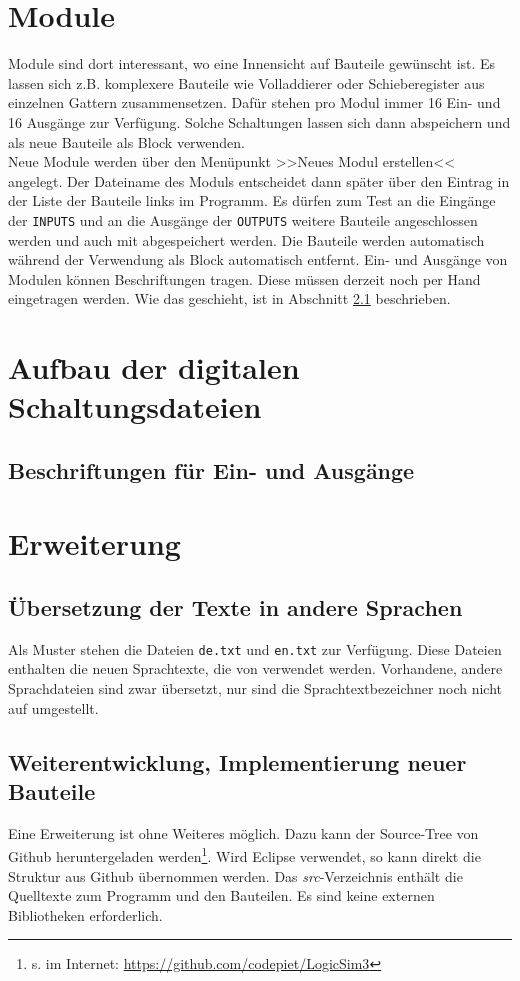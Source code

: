 \documentclass[12pt]{scrartcl}
\begin{document}
\section{Module}
Module sind dort interessant, wo eine Innensicht auf Bauteile gewünscht ist. Es lassen sich z.B. komplexere Bauteile wie Volladdierer oder Schieberegister aus einzelnen Gattern zusammensetzen. Dafür stehen pro Modul immer 16 Ein- und 16 Ausgänge zur Verfügung. Solche Schaltungen lassen sich dann abspeichern und als neue Bauteile als Block verwenden.\\

Neue Module werden über den Menüpunkt >>Neues Modul erstellen<< angelegt. Der Dateiname des Moduls entscheidet dann später über den Eintrag in der Liste der Bauteile links im Programm. Es dürfen zum Test an die Eingänge der \texttt{INPUTS} und an die Ausgänge der \texttt{OUTPUTS} weitere Bauteile angeschlossen werden und auch mit abgespeichert werden. Die Bauteile werden automatisch während der Verwendung als Block automatisch entfernt.
Ein- und Ausgänge von Modulen können Beschriftungen tragen. Diese müssen derzeit noch per Hand eingetragen werden. Wie das geschieht, ist in Abschnitt \ref{labels} beschrieben.

\section{Aufbau der digitalen Schaltungsdateien}
\subsection{Beschriftungen für Ein- und Ausgänge}
\label{labels}

\section{Erweiterung}
\subsection{Übersetzung der Texte in andere Sprachen}
Als Muster stehen die Dateien \texttt{de.txt} und \texttt{en.txt} zur Verfügung. Diese Dateien enthalten die neuen Sprachtexte, die von \lsN{} verwendet werden. Vorhandene, andere Sprachdateien sind zwar übersetzt, nur sind die Sprachtextbezeichner noch nicht auf \lsN{} umgestellt.

\subsection{Weiterentwicklung, Implementierung neuer Bauteile}
Eine Erweiterung ist ohne Weiteres möglich. Dazu kann der Source-Tree von Github heruntergeladen werden\footnote{s. im Internet: \url{https://github.com/codepiet/LogicSim3}}. Wird Eclipse verwendet, so kann direkt die Struktur aus Github übernommen werden. Das \textit{src}-Verzeichnis enthält die Quelltexte zum Programm und den Bauteilen. Es sind keine externen Bibliotheken erforderlich.\\
\end{document}
